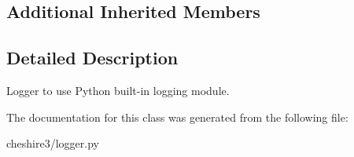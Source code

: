 \subsection*{Additional Inherited Members}


\subsection{Detailed Description}
\begin{DoxyVerb}Logger to use Python built-in logging module.\end{DoxyVerb}
 

The documentation for this class was generated from the following file\-:\begin{DoxyCompactItemize}
\item 
cheshire3/logger.\-py\end{DoxyCompactItemize}
